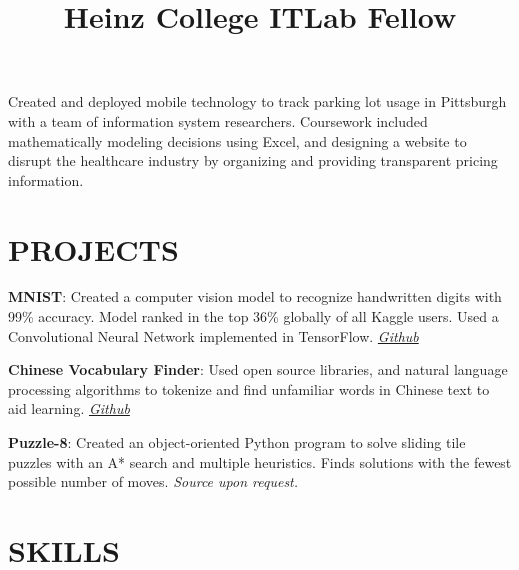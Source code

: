 \documentclass[margin]{resume/res}
\begin{document}
\begin{resume}
\title{\textbf{Heinz College ITLab Fellow}}
\begin{position}
Created and deployed mobile technology to track parking lot usage in Pittsburgh with a team of information system researchers. Coursework included mathematically modeling decisions using Excel, and designing a website to disrupt the healthcare industry by organizing and providing transparent pricing information.
\end{position}

\section{PROJECTS}

\par
\textbf{MNIST}:
Created a computer vision model to recognize handwritten digits with 99\% accuracy. Model ranked in the top 36\% globally of all Kaggle users. Used a Convolutional Neural Network implemented in TensorFlow. \textit{\href{https://github.com/lucaskjaero/MNIST}{Github}}

\par
\textbf{Chinese Vocabulary Finder}:
Used open source libraries, and natural language processing algorithms to tokenize and find unfamiliar words in Chinese text to aid learning. \textit{\href{https://github.com/lucaskjaero/Chinese-Vocabulary-Finder}{Github}}
\par
\textbf{Puzzle-8}:
Created an object-oriented Python program to solve sliding tile puzzles with an A* search and multiple heuristics. Finds solutions with the fewest possible number of moves. \textit{Source upon request.}


\section{SKILLS}


\end{resume}
\end{document}

